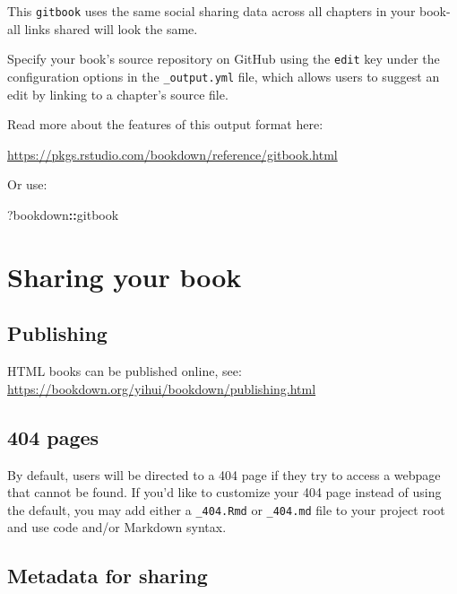 \documentclass[
]{book}
\newenvironment{Shaded}{\begin{snugshade}}{\end{snugshade}}
\newcommand{\NormalTok}[1]{#1}
\newcommand{\SpecialCharTok}[1]{\textcolor[rgb]{0.81,0.36,0.00}{\textbf{#1}}}
\theoremstyle{definition}
\theoremstyle{definition}
\theoremstyle{definition}
\theoremstyle{definition}
\theoremstyle{remark}
\begin{document}
This \texttt{gitbook} uses the same social sharing data across all chapters in your book- all links shared will look the same.

Specify your book's source repository on GitHub using the \texttt{edit} key under the configuration options in the \texttt{\_output.yml} file, which allows users to suggest an edit by linking to a chapter's source file.

Read more about the features of this output format here:

\url{https://pkgs.rstudio.com/bookdown/reference/gitbook.html}

Or use:

\begin{Shaded}
\begin{Highlighting}[]
\NormalTok{?bookdown}\SpecialCharTok{::}\NormalTok{gitbook}
\end{Highlighting}
\end{Shaded}

\hypertarget{sharing-your-book-1}{%
\chapter{Sharing your book}\label{sharing-your-book-1}}

\hypertarget{publishing-1}{%
\section{Publishing}\label{publishing-1}}

HTML books can be published online, see: \url{https://bookdown.org/yihui/bookdown/publishing.html}

\hypertarget{pages-1}{%
\section{404 pages}\label{pages-1}}

By default, users will be directed to a 404 page if they try to access a webpage that cannot be found. If you'd like to customize your 404 page instead of using the default, you may add either a \texttt{\_404.Rmd} or \texttt{\_404.md} file to your project root and use code and/or Markdown syntax.

\hypertarget{metadata-for-sharing-1}{%
\section{Metadata for sharing}\label{metadata-for-sharing-1}}
\end{document}
